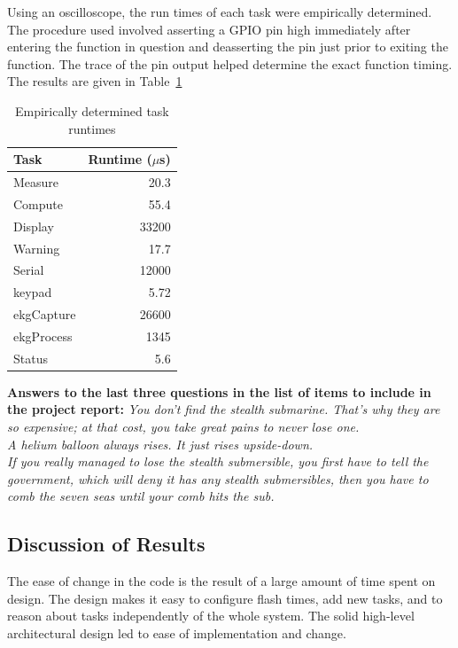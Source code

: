 \documentclass[12pt]{article} %
\begin{document}
    Using an oscilloscope, the run times of each task were empirically
		determined. The procedure used involved asserting a GPIO pin high
		immediately after entering the function in question and deasserting the pin
		just prior to exiting the function. The trace of the pin output helped
		determine the exact function timing. The results are given in
		Table~\ref{tab:taskRuntimes}

    \begin{table}[h]
      \centering
      \begin{tabular}{|l|r|} 
	\hline
	Task & Runtime ($\mu$s) \\ \hline
	Measure & 20.3 \\ \hline
	Compute & 55.4 \\ \hline
	Display & 33200 \\ \hline
	Warning & 17.7 \\ \hline
    Serial & 12000 \\ \hline
    keypad & 5.72 \\ \hline
    ekgCapture & 26600 \\ \hline
    ekgProcess & 1345 \\ \hline
	Status & 5.6 \\ \hline
      \end{tabular}
      \caption{Empirically determined task runtimes}
      \label{tab:taskRuntimes}
    \end{table}

    \textbf{Answers to the last three questions in the list of items to include
    in the project report:}
    \emph{You don't find the stealth submarine. That's why they are so expensive; at that cost, you take great pains to never lose one.\\  A helium balloon always rises. It just rises upside-down. \\ If you really managed to lose the stealth submersible, you first have to tell the government, which will deny it has any stealth submersibles, then you have to comb the seven seas until your comb hits the sub.}

    \subsection{Discussion of Results}
    The ease of change in the code is the result of a large amount of time spent on
    design. The design makes it easy to configure flash times, add new tasks, and
    to reason about tasks independently of the whole system. The solid high-level
    architectural design led to ease of implementation and change.
\end{document}
